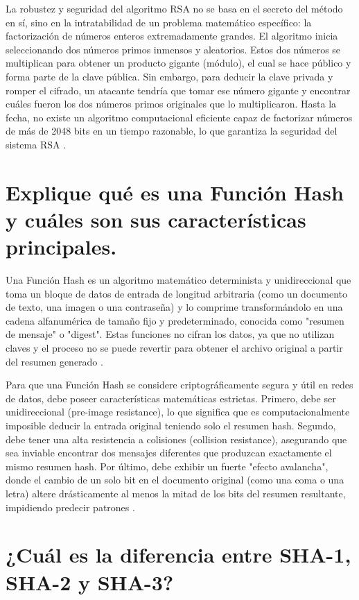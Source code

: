 \documentclass[a4paper,12pt]{article}
\begin{document}
La robustez y seguridad del algoritmo RSA no se basa en el secreto del método en sí, sino en la intratabilidad de un problema matemático específico: la factorización de números enteros extremadamente grandes. El algoritmo inicia seleccionando dos números primos inmensos y aleatorios. Estos dos números se multiplican para obtener un producto gigante (módulo), el cual se hace público y forma parte de la clave pública. Sin embargo, para deducir la clave privada y romper el cifrado, un atacante tendría que tomar ese número gigante y encontrar cuáles fueron los dos números primos originales que lo multiplicaron. Hasta la fecha, no existe un algoritmo computacional eficiente capaz de factorizar números de más de 2048 bits en un tiempo razonable, lo que garantiza la seguridad del sistema RSA \cite{forouzan2015}.

\section{Explique qué es una Función Hash y cuáles son sus características principales.}

Una Función Hash es un algoritmo matemático determinista y unidireccional que toma un bloque de datos de entrada de longitud arbitraria (como un documento de texto, una imagen o una contraseña) y lo comprime transformándolo en una cadena alfanumérica de tamaño fijo y predeterminado, conocida como "resumen de mensaje" o "digest". Estas funciones no cifran los datos, ya que no utilizan claves y el proceso no se puede revertir para obtener el archivo original a partir del resumen generado \cite{stallings2017}.

Para que una Función Hash se considere criptográficamente segura y útil en redes de datos, debe poseer características matemáticas estrictas. Primero, debe ser unidireccional (pre-image resistance), lo que significa que es computacionalmente imposible deducir la entrada original teniendo solo el resumen hash. Segundo, debe tener una alta resistencia a colisiones (collision resistance), asegurando que sea inviable encontrar dos mensajes diferentes que produzcan exactamente el mismo resumen hash. Por último, debe exhibir un fuerte "efecto avalancha", donde el cambio de un solo bit en el documento original (como una coma o una letra) altere drásticamente al menos la mitad de los bits del resumen resultante, impidiendo predecir patrones \cite{ibm2023}.

\section{¿Cuál es la diferencia entre SHA-1, SHA-2 y SHA-3?}
\end{document}
